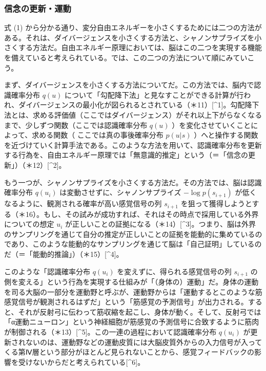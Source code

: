 \subsubsection{信念の更新・運動}\label{ux4fe1ux5ff5ux306eux66f4ux65b0ux904bux52d5}

式 (1)
から分かる通り、変分自由エネルギーを小さくするためには二つの方法がある。それは、ダイバージェンスを小さくする方法と、シャノンサプライズを小さくする方法だ。自由エネルギー原理においては、脳はこの二つを実現する機能を備えていると考えられている。では、この二つの方法について順にみていこう。

まず、ダイバージェンスを小さくする方法についてだ。この方法では、脳内で認識確率分布
\(q(u)\)
について「勾配降下法」と見なすことができる計算が行われ、ダイバージェンスの最小化が図られるとされている（＊11）{[}\^{}1{]}。勾配降下法とは、求める評価値（ここではダイバージェンス）がそれ以上下がらなくなるまで、少しずつ関数（ここでは認識確率分布
\(q(u)\) ）を変化させていくことによって、求める関数（
ここでは真の事後確率分布 \(p(u|s)\)
）へと操作する関数を近づけていく計算手法である。このような方法を用いて、認識確率分布を更新する行為を、自由エネルギー原理では「無意識的推定」という（＝「信念の更新」）（＊12）{[}\^{}2{]}。

もう一つが、シャノンサプライズを小さくする方法だ。その方法では、脳は認識確率分布
\(q(u_i)\) は変動させずに、シャノンサプライズ \(-\log{p(s_{i+1})}\)
が低くなるように、観測される確率が高い感覚信号の列 \(s_{i+1}\)
を狙って獲得しようとする（＊16）。もし、その試みが成功すれば、それはその時点で採用している外界についての想定
\(u_i\)
が正しいことの証拠になる（＊14）{[}\^{}3{]}。つまり、脳は外界のサンプリングを通じて自分の推定が正しいことの証拠を能動的に集めているのであり、このような能動的なサンプリングを通じて脳は「自己証明」しているのだ（＝「能動的推論」）（＊15）{[}\^{}4{]}。

このような「認識確率分布 \(q(u_i)\) を変えずに、得られる感覚信号の列
\(s_{i+1}\)
の側を変える」という行為を実現する仕組みが「（身体の）運動」だ。身体の運動を司る大脳の一部分を運動野と呼ぶが、運動野からは「運動するとこのような筋感覚信号が観測されるはずだ」という「筋感覚の予測信号」が出力される。すると、それが反射弓に伝わって筋収縮を起こし、身体が動く。そして、反射弓では「α運動ニューロン」という神経細胞が筋感覚の予測信号に合致するように筋肉が制御される（＊13）{[}\^{}5{]}。この一連の過程において認識確率分布
\(q(u_i)\)
が更新されないのは、運動野などの運動皮質には大脳皮質外からの入力信号が入ってくる第Ⅳ層という部分がほとんど見られないことから、感覚フィードバックの影響を受けないからだと考えられている{[}\^{}6{]}。

